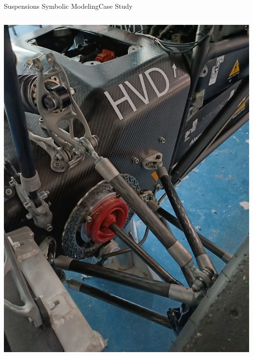 \begin{frame}{Suspensions Symbolic Modeling}{Case Study}
\begin{columns}
\begin{column}[c]{0.25\textwidth}
      \includegraphics[width=1.0\textwidth]{./figures/fsae.jpeg}
    \end{column}
  \end{columns}
\end{frame}

